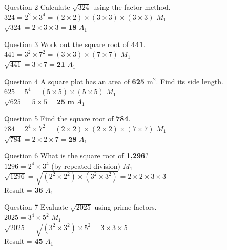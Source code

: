 \documentclass[12pt, a4paper, oneside]{article}
\begin{document}
\begin{solvingbox}{Question 2}
Calculate $\sqrt{324}$ using the factor method. \\
$324 = 2^2 \times 3^4 = (2 \times 2) \times (3 \times 3) \times (3 \times 3)$ \hfill $M_1$ \\
$\sqrt{324} = 2 \times 3 \times 3 = \mathbf{18}$ \hfill $A_1$
\end{solvingbox}

\begin{solvingbox}{Question 3}
Work out the square root of \textbf{441}. \\
$441 = 3^2 \times 7^2 = (3 \times 3) \times (7 \times 7)$ \hfill $M_1$ \\
$\sqrt{441} = 3 \times 7 = \mathbf{21}$ \hfill $A_1$
\end{solvingbox}

\begin{solvingbox}{Question 4}
A square plot has an area of \textbf{625 $\text{m}^2$}. Find its side length. \\
$625 = 5^4 = (5 \times 5) \times (5 \times 5)$ \hfill $M_1$ \\
$\sqrt{625} = 5 \times 5 = \mathbf{25\text{ m}}$ \hfill $A_1$
\end{solvingbox}

\begin{solvingbox}{Question 5}
Find the square root of \textbf{784}. \\
$784 = 2^4 \times 7^2 = (2 \times 2) \times (2 \times 2) \times (7 \times 7)$ \hfill $M_1$ \\
$\sqrt{784} = 2 \times 2 \times 7 = \mathbf{28}$ \hfill $A_1$
\end{solvingbox}
\begin{solvingbox}{Question 6}
What is the square root of \textbf{1,296}? \\
$1296 = 2^4 \times 3^4$ (by repeated division) \hfill $M_1$ \\
$\sqrt{1296} = \sqrt{(2^2 \times 2^2) \times (3^2 \times 3^2)} = 2 \times 2 \times 3 \times 3$ \\
Result = \textbf{36} \hfill $A_1$
\end{solvingbox}

\begin{solvingbox}{Question 7}
Evaluate $\sqrt{2025}$ using prime factors. \\
$2025 = 3^4 \times 5^2$ \hfill $M_1$ \\
$\sqrt{2025} = \sqrt{(3^2 \times 3^2) \times 5^2} = 3 \times 3 \times 5$ \\
Result = \textbf{45} \hfill $A_1$
\end{solvingbox}
\end{document}
